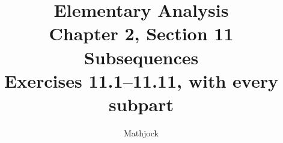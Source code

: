 
\title{\textbf{Elementary Analysis}\\[0.3em]
Chapter 2, Section 11\\[0.3em]
\large Subsequences\\
Exercises 11.1--11.11, with every subpart}
\author{Mathjock}
\date{}

\maketitle
\bookinfo
\tableofcontents
\clearpage
\setcounter{section}{10}


